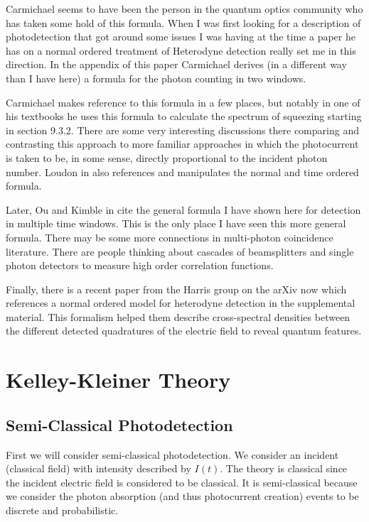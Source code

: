 \documentclass[12pt]{article}
\begin{document}
Carmichael seems to have been the person in the quantum optics community who has taken some hold of this formula. When I was first looking for a description of photodetection that got around some issues I was having at the time a paper he has on a normal ordered  treatment of Heterodyne detection \cite{Carmichael1987} really set me in this direction. In the appendix of this paper Carmichael derives (in a different way than I have here) a formula for the photon counting in two windows. 

Carmichael makes reference to this formula in a few places, but notably in one of his textbooks \cite{Carmichael2009} he uses this formula to calculate the spectrum of squeezing starting in section 9.3.2. There are some very interesting discussions there comparing and contrasting this approach to more familiar approaches in which the photocurrent is taken to be, in some sense, directly proportional to the incident photon number. Loudon in \cite{Loudon2000} also references and manipulates the normal and time ordered formula.

Later, Ou and Kimble in \cite{Ou1995} cite the general formula I have shown here for detection in multiple time windows. This is the only place I have seen this more general formula. There may be some more connections in multi-photon coincidence literature. There are people thinking about cascades of beamsplitters and single photon detectors to measure high order correlation functions.

Finally, there is a recent paper from the Harris group \cite{Shkarin2017} on the arXiv now which references a normal ordered model for heterodyne detection in the supplemental material. This formalism helped them describe cross-spectral densities between the different detected quadratures of the electric field to reveal quantum features.

\section{Kelley-Kleiner Theory}

\subsection{Semi-Classical Photodetection}

First we will consider semi-classical photodetection. We consider an incident (classical field) with intensity described by $I(t)$. The theory is classical since the incident electric field is considered to be classical. It is semi-classical because we consider the photon absorption (and thus photocurrent creation) events to be discrete and probabilistic. 
\end{document}
